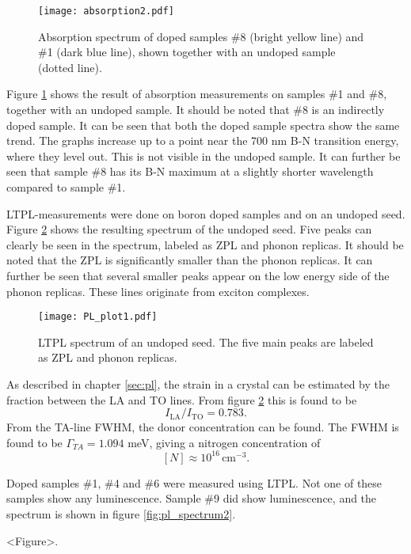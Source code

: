 \begin{figure}[h]
\begin{center}
\texttt{[image: absorption2.pdf]}
\caption{Absorption spectrum of doped samples \#8 (bright yellow line) and \#1 (dark blue line), shown together with an undoped sample (dotted line). 
\label{fig:abs2}}
\end{center}
\end{figure}

Figure \ref{fig:abs2} shows the result of absorption measurements on samples \#1 and \#8, together with an undoped sample. It should be noted that \#8 is an indirectly doped sample. It can be seen that both the doped sample spectra show the same trend. The graphs increase up to a point near the 700 nm B-N transition energy, where they level out. This is not visible in the undoped sample. It can further be seen that sample \#8 has its B-N maximum at a slightly shorter wavelength compared to sample \#1. 



LTPL-measurements were done on boron doped samples and on an undoped seed. Figure \ref{fig:pl_spectrum1} shows the resulting spectrum of the undoped seed. Five peaks can clearly be seen in the spectrum, labeled as ZPL and phonon replicas. It should be noted that the ZPL is significantly smaller than the phonon replicas. It can further be seen that several smaller peaks appear on the low energy side of the phonon replicas. These lines originate from exciton complexes.  

\begin{figure}[h]
\begin{center}
\texttt{[image: PL\_plot1.pdf]}
\caption{LTPL spectrum of an undoped seed. The five main peaks are labeled as ZPL and phonon replicas. 
\label{fig:pl_spectrum1}}
\end{center}
\end{figure}

As described in chapter \ref{sec:pl}, the strain in a crystal can be estimated by the fraction between the LA and TO lines. From figure \ref{fig:pl_spectrum1} this is found to be 
\[I_\mathrm{LA}/I_\mathrm{TO} = 0.783.\]
From the TA-line FWHM, the donor concentration can be found. The FWHM is found to be $\Gamma_{TA} = 1.094$ meV, giving a nitrogen concentration of 
\[[N] \approx 10^{16} \, \mathrm{cm^{-3}}.\]

Doped samples \#1, \#4 and \#6 were measured using LTPL. Not one of these samples show any luminescence. Sample \#9 did show luminescence, and the spectrum is shown in figure \ref{fig:pl_spectrum2}. 

<Figure>.


































